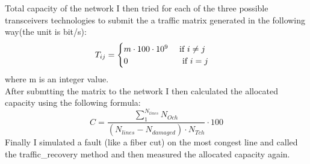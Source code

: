 \documentclass{beamer}
\begin{document}
	\begin{frame}{Total capacity of the network}
		I then tried for each of the three possible transceivers technologies to submit the a traffic matrix generated  in the following way(the unit is bit/s):
		\begin{equation} \label{eq:T}
			T_{ij} = \begin{cases}
				m \cdot 100 \cdot 10^9 $\hspace{10px} if $ i \neq j \\
				0$\hspace{61px} if $ i = j
			\end{cases}
		\end{equation} 
		where m is an integer value.\pause \\
		After submtting the matrix to the network I then calculated the allocated capacity using the following formula:
		\begin{equation}
			C = \frac{\sum_{1}^{N_{lines}} N_{Och}}{\left(N_{lines} - N_{damaged}\right) \cdot N_{Tch}} \cdot 100
		\end{equation}\pause
		Finally I simulated a fault (like a fiber cut) on the most congest line and called the traffic\_recovery method and then measured the allocated capacity again.
	\end{frame}
\end{document}
